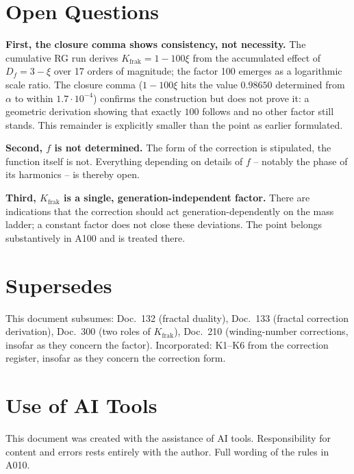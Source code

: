 \section{Open Questions}

\textbf{First, the closure comma shows consistency, not necessity.} The
cumulative RG run derives $K_\text{frak}=1-100\xi$ from the accumulated effect
of $D_f=3-\xi$ over 17 orders of magnitude; the factor 100 emerges as a
logarithmic scale ratio. The closure comma ($1-100\xi$ hits the value
$0.98650$ determined from $\alpha$ to within $1.7\cdot10^{-4}$) confirms the construction but does not prove it: a geometric
derivation showing that exactly $100$ follows and no other factor still stands.
This remainder is explicitly smaller than the point as earlier formulated.

\textbf{Second, $f$ is not determined.} The form of the correction is stipulated,
the function itself is not. Everything depending on details of $f$ -- notably
the phase of its harmonics -- is thereby open.

\textbf{Third, $K_\text{frak}$ is a single, generation-independent factor.}
There are indications that the correction should act generation-dependently on
the mass ladder; a constant factor does not close these deviations. The point
belongs substantively in A100 and is treated there.

\section{Supersedes}

This document subsumes: Doc.~132 (fractal duality), Doc.~133 (fractal correction
derivation), Doc.~300 (two roles of $K_\text{frak}$), Doc.~210 (winding-number
corrections, insofar as they concern the factor). Incorporated: K1--K6 from the
correction register, insofar as they concern the correction form.

\section{Use of AI Tools}

This document was created with the assistance of AI tools.
Responsibility for content and errors rests entirely with the author.
Full wording of the rules in A010.
